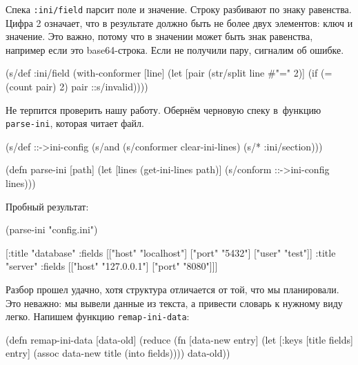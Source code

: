 
Спека \verb|:ini/field| парсит поле и значение. Строку разбивают по знаку
равенства. Цифра 2 означает, что в результате должно быть не более двух
элементов: ключ и значение. Это важно, потому что в значении может быть знак
равенства, например если это base64-строка. Если не получили пару, сигналим об
ошибке.

\begin{english}
  \begin{clojure}
(s/def :ini/field
  (with-conformer [line]
    (let [pair (str/split line #"=" 2)]
      (if (= (count pair) 2)
        pair
        ::s/invalid))))
  \end{clojure}
\end{english}

Не терпится проверить нашу работу. Обернём черновую спеку в~функцию
\verb|parse-ini|, которая читает файл.

\begin{english}
  \begin{clojure}
(s/def ::->ini-config
  (s/and
   (s/conformer clear-ini-lines)
   (s/* :ini/section)))

(defn parse-ini [path]
  (let [lines (get-ini-lines path)]
    (s/conform ::->ini-config lines)))
  \end{clojure}
\end{english}

\noindent
Пробный результат:

\begin{english}
  \begin{clojure}
(parse-ini "config.ini")

[{:title "database"
  :fields [["host" "localhost"]
           ["port" "5432"]
           ["user" "test"]]}
 {:title "server"
  :fields [["host" "127.0.0.1"]
           ["port" "8080"]]}]
  \end{clojure}
\end{english}

Разбор прошел удачно, хотя структура отличается от той, что мы планировали. Это
неважно: мы вывели данные из текста, а привести словарь к нужному виду
легко. Напишем функцию \verb|remap-ini-data|:

\begin{english}
  \begin{clojure}
(defn remap-ini-data [data-old]
  (reduce
   (fn [data-new entry]
     (let [{:keys [title fields]} entry]
       (assoc data-new title (into {} fields))))
   {}
   data-old))
  \end{clojure}
\end{english}

